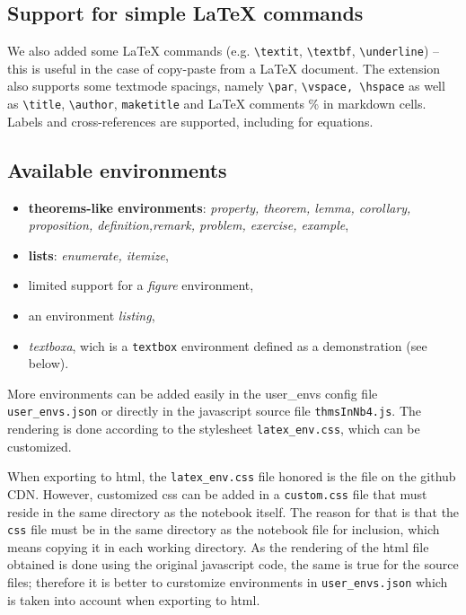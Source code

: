     \subsection{Support for simple LaTeX
commands}\label{support-for-simple-latex-commands}

    We also added some LaTeX commands (e.g. \texttt{\textbackslash{}textit},
\texttt{\textbackslash{}textbf}, \texttt{\textbackslash{}underline}) --
this is useful in the case of copy-paste from a LaTeX document. The
extension also supports some textmode spacings, namely
\texttt{\textbackslash{}par},
\texttt{\textbackslash{}vspace,\ \textbackslash{}hspace} as well as
\texttt{\textbackslash{}title}, \texttt{\textbackslash{}author},
\texttt{maketitle} and LaTeX comments \% in markdown cells. Labels and
cross-references are supported, including for equations.

    \subsection{Available environments}\label{available-environments}

    \begin{itemize}
\tightlist
\item
  \textbf{theorems-like environments}: \emph{property, theorem, lemma,
  corollary, proposition, definition,remark, problem, exercise,
  example},
\item
  \textbf{lists}: \emph{enumerate, itemize},\\
\item
  limited support for a \emph{figure} environment,
\item
  an environment \emph{listing},
\item
  \emph{textboxa}, wich is a \texttt{textbox} environment defined as a
  demonstration (see below).
\end{itemize}

More environments can be added easily in the user\_envs config file
\texttt{user\_envs.json} or directly in the javascript source file
\texttt{thmsInNb4.js}. The rendering is done according to the stylesheet
\texttt{latex\_env.css}, which can be customized.
\begin{remark} When exporting to html, the
\texttt{latex\_env.css} file honored is the file on the github CDN.
However, customized css can be added in a \texttt{custom.css} file that
must reside in the same directory as the notebook itself. The reason for
that is that the \texttt{css} file must be in the same directory as the
notebook file for inclusion, which means copying it in each working
directory. As the rendering of the html file obtained is done using the
original javascript code, the same is true for the source files;
therefore it is better to curstomize environments in
\texttt{user\_envs.json} which is taken into account when exporting to
html.\\
\end{remark}

